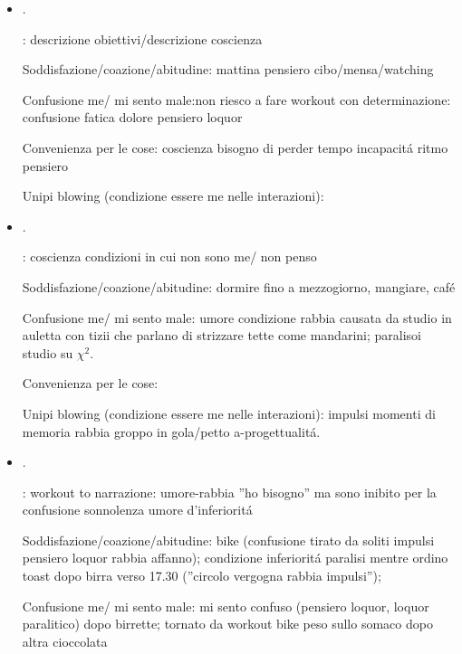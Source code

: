 \begin{itemize}
Confusione me/ mi sento male: confusione dopo pranzo/dopo cena - il tempo passato su ebay

Convenienza per le cose:

Unipi blowing (condizione essere me nelle interazioni):

\item {}.

: descrizione obiettivi/descrizione coscienza

Soddisfazione/coazione/abitudine: mattina pensiero cibo/mensa/watching

Confusione me/ mi sento male:non riesco a fare workout con determinazione: confusione fatica dolore pensiero loquor

Convenienza per le cose: coscienza bisogno di perder tempo incapacit\'a ritmo pensiero

Unipi blowing (condizione essere me nelle interazioni):

\item {}.

: coscienza condizioni in cui non sono me/ non penso

Soddisfazione/coazione/abitudine: dormire fino a mezzogiorno, mangiare, caf\'e

Confusione me/ mi sento male: umore condizione rabbia causata da studio in auletta con tizii che parlano di strizzare tette come mandarini; paralisoi studio su $\chi^2$.

Convenienza per le cose:

Unipi blowing (condizione essere me nelle interazioni): impulsi momenti di memoria rabbia groppo in gola/petto a-progettualit\'a.

\item {}.

: workout to narrazione: umore-rabbia ''ho bisogno'' ma sono inibito per la confusione sonnolenza umore d'inferiorit\'a

Soddisfazione/coazione/abitudine: bike (confusione tirato da soliti impulsi pensiero loquor rabbia affanno); condizione inferiorit\'a paralisi mentre ordino toast dopo birra verso 17.30 (''circolo vergogna rabbia impulsi''); 

Confusione me/ mi sento male: mi sento confuso (pensiero loquor, loquor paralitico) dopo birrette; tornato da workout bike peso sullo somaco dopo altra cioccolata


\end{itemize}

